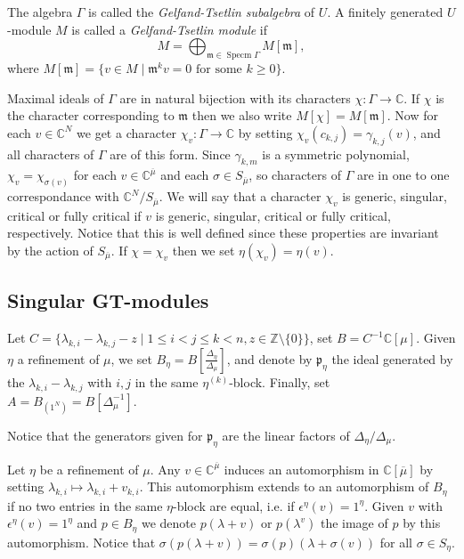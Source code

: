 \documentclass[11pt,fleqn]{article}
\newcommand\CC{\mathbb C}
\newcommand\ZZ{\mathbb Z}
\renewcommand\to{\longrightarrow}
\newcommand\p{\mathfrak p}
\newcommand\m{\mathfrak m}
\DeclareMathOperator\Specm{Specm}
\begin{document}
\begin{Definition}
\label{D:gt-modules}
The algebra $\Gamma$ is called the \emph{Gelfand-Tsetlin subalgebra} of 
$U$. A finitely generated $U$-module $M$ is called a 
\emph{Gelfand-Tsetlin module} if
\[
  M = \bigoplus_{\mathfrak m \in \Specm \Gamma} M [\mathfrak m],
\] 
where $M[\mathfrak m] = \{v \in M \mid \mathfrak m^k v = 0 \mbox{ for some } k 
\geq 0\}$.
\end{Definition}
Maximal ideals of $\Gamma$ are in natural bijection with its characters
$\chi: \Gamma \to \CC$. If $\chi$ is the character corresponding to $\m$ then
we also write $M[\chi] = M[\m]$. Now for each $v \in \CC^N$ we get a character 
$\chi_v: \Gamma \to \CC$ by setting $\chi_v(c_{k,j}) = \gamma_{k,j}(v)$, and
all characters of $\Gamma$ are of this form. Since $\gamma_{k,m}$ is a 
symmetric polynomial, $\chi_v = \chi_{\sigma(v)}$ for each $v \in 
\CC^{\overline \mu}$ and each $\sigma \in S_{\overline \mu}$, so characters of 
$\Gamma$ are in one to one correspondance with $\CC^N/ S_{\overline \mu}$. We 
will say that a character $\chi_v$ is generic, singular, critical or fully 
critical if $v$ is generic, singular, critical or fully critical, 
respectively. Notice that this is well defined since these properties are 
invariant by the action of $S_{\overline \mu}$. If $\chi = \chi_v$ then we set 
$\eta(\chi_v) = \eta(v)$. 

\subsection{Singular GT-modules}
\begin{Definition}
Let $C = \{\lambda_{k,i} - \lambda_{k,j} - z \mid 1 \leq i < j \leq k < n, 
z \in \ZZ \setminus \{0\}\}$, set $B = C^{-1}\CC[\mu]$. Given $\eta$ a
refinement of $\mu$, we set $B_\eta = B\left[\frac{\Delta_\eta}{\Delta_\mu}
\right]$, and denote by $\p_\eta$ the ideal generated by the $\lambda_{k,i} - 
\lambda_{k,j}$ with $i,j$ in the same $\eta^{(k)}$-block. Finally, set $A = 
B_{(1^N)} = B[\Delta_\mu^{-1}]$.
\end{Definition}
Notice that the generators given for $\p_\eta$ are the linear factors of
$\Delta_\eta/\Delta_\mu$. 

Let $\eta$ be a refinement of $\mu$. Any $v \in \CC^{\overline \mu}$ induces 
an automorphism in $\CC[\overline \mu]$ by setting $\lambda_{k,i} \mapsto 
\lambda_{k,i} + v_{k,i}$. This automorphism extends to an automorphism of 
$B_\eta$ if no two entries in the same $\eta$-block are equal, i.e. if  
$\epsilon^\eta(v) = 1^\eta$. Given $v$ with $\epsilon^\eta(v) = 1^\eta$ and 
$p \in B_\eta$ we denote $p(\lambda + v)$ or $p(\lambda^v)$ the image of $p$ 
by this automorphism. Notice that $\sigma(p(\lambda + v)) = 
\sigma(p)(\lambda + \sigma(v))$ for all $\sigma \in S_\eta$.
\end{document}
